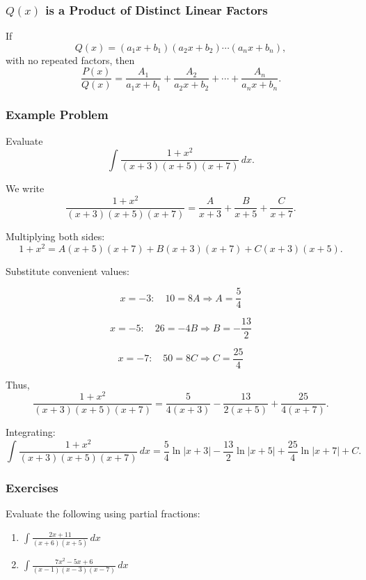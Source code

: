 \subsubsection{$Q(x)$ is a Product of Distinct Linear Factors}
\label{sss:qxis-013e}

If
\[
Q(x) = (a_1x+b_1)(a_2x+b_2)\cdots(a_nx+b_n),
\]
with no repeated factors, then
\[
\frac{P(x)}{Q(x)} =
\frac{A_1}{a_1x+b_1} + \frac{A_2}{a_2x+b_2} + \cdots + \frac{A_n}{a_nx+b_n}.
\]

\subsubsection{Example Problem}
\label{sss:exam-accd}

Evaluate
\[
\int \frac{1+x^2}{(x+3)(x+5)(x+7)}\,dx.
\]

We write
\[
\frac{1+x^2}{(x+3)(x+5)(x+7)}
= \frac{A}{x+3} + \frac{B}{x+5} + \frac{C}{x+7}.
\]

Multiplying both sides:
\[
1+x^2 = A(x+5)(x+7) + B(x+3)(x+7) + C(x+3)(x+5).
\]

Substitute convenient values:

\[
x=-3:\quad 10 = 8A \Rightarrow A = \frac{5}{4}
\]

\[
x=-5:\quad 26 = -4B \Rightarrow B = -\frac{13}{2}
\]

\[
x=-7:\quad 50 = 8C \Rightarrow C = \frac{25}{4}
\]

Thus,
\[
\frac{1+x^2}{(x+3)(x+5)(x+7)}
= \frac{5}{4(x+3)} - \frac{13}{2(x+5)} + \frac{25}{4(x+7)}.
\]

Integrating:
\[
\int \frac{1+x^2}{(x+3)(x+5)(x+7)}\,dx
= \frac{5}{4}\ln|x+3| - \frac{13}{2}\ln|x+5| + \frac{25}{4}\ln|x+7| + C.
\]

\subsubsection{Exercises}
\label{sss:exer-pf-linear}

Evaluate the following using partial fractions:

\begin{enumerate}
\item $\displaystyle \int \frac{2x+11}{(x+6)(x+5)}\,dx$
\item $\displaystyle \int \frac{7x^2-5x+6}{(x-1)(x-3)(x-7)}\,dx$
\end{enumerate}


